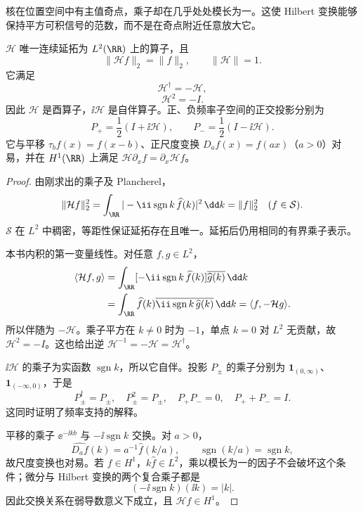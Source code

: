 核在位置空间中有主值奇点，乘子却在几乎处处模长为一。这使 Hilbert 变换能够保持平方可积信号的范数，而不是在奇点附近任意放大它。
\begin{theorem}
$\mathcal H$ 唯一连续延拓为 $L^2(\RR)$ 上的算子，且
\[
\|\mathcal Hf\|_2=\|f\|_2,\qquad \|\mathcal H\|=1.
\]
它满足
\begin{equation}
\mathcal H^\dagger=-\mathcal H,
\label{eq:hilbert-skew-adjoint}
\end{equation}
\begin{equation}
\mathcal H^2=-I.
\label{eq:hilbert-square}
\end{equation}
因此 $\mathcal H$ 是酉算子，$\ii\mathcal H$ 是自伴算子。正、负频率子空间的正交投影分别为
\[
P_+=\frac12(I+\ii\mathcal H),\qquad
P_-=\frac12(I-\ii\mathcal H).
\]
它与平移 $\tau_bf(x)=f(x-b)$、正尺度变换 $D_af(x)=f(ax)$（$a>0$）对易，并在 $H^1(\RR)$ 上满足 $\mathcal H\partial_xf=\partial_x\mathcal Hf$。
\end{theorem}
\begin{proof}
由刚求出的乘子及 Plancherel，
\[
\|\mathcal Hf\|_2^2
=\int_{\RR}|-\ii\operatorname{sgn}k\,\widehat f(k)|^2\,\dd k
=\|f\|_2^2\quad(f\in\mathcal S).
\]
$\mathcal S$ 在 $L^2$ 中稠密，等距性保证延拓存在且唯一。延拓后仍用相同的有界乘子表示。

本书内积的第一变量线性。对任意 $f,g\in L^2$，
\begin{align*}
\langle\mathcal Hf,g\rangle
&=\int_{\RR}[-\ii\operatorname{sgn}k\,\widehat f(k)]
\overline{\widehat g(k)}\,\dd k\\
&=\int_{\RR}\widehat f(k)
\overline{\ii\operatorname{sgn}k\,\widehat g(k)}\,\dd k
=\langle f,-\mathcal Hg\rangle.
\end{align*}
所以伴随为 $-\mathcal H$。乘子平方在 $k\ne0$ 时为 $-1$，单点 $k=0$ 对 $L^2$ 无贡献，故 $\mathcal H^2=-I$。这也给出逆 $\mathcal H^{-1}=-\mathcal H=\mathcal H^\dagger$。

$\ii\mathcal H$ 的乘子为实函数 $\operatorname{sgn}k$，所以它自伴。投影 $P_\pm$ 的乘子分别为 $\mathbf1_{(0,\infty)}$、$\mathbf1_{(-\infty,0)}$，于是
\[
P_\pm^\dagger=P_\pm,\quad P_\pm^2=P_\pm,
\quad P_+P_-=0,\quad P_++P_-=I.
\]
这同时证明了频率支持的解释。

平移的乘子 $\ee^{-\ii kb}$ 与 $-\ii\operatorname{sgn}k$ 交换。对 $a>0$，
\[
\widehat{D_af}(k)=a^{-1}\widehat f(k/a),
\qquad \operatorname{sgn}(k/a)=\operatorname{sgn}k,
\]
故尺度变换也对易。若 $f\in H^1$，$k\widehat f\in L^2$，乘以模长为一的因子不会破坏这个条件；微分与 Hilbert 变换的两个复合乘子都是
\[
(-\ii\operatorname{sgn}k)(\ii k)=|k|.
\]
因此交换关系在弱导数意义下成立，且 $\mathcal Hf\in H^1$。
\end{proof}


